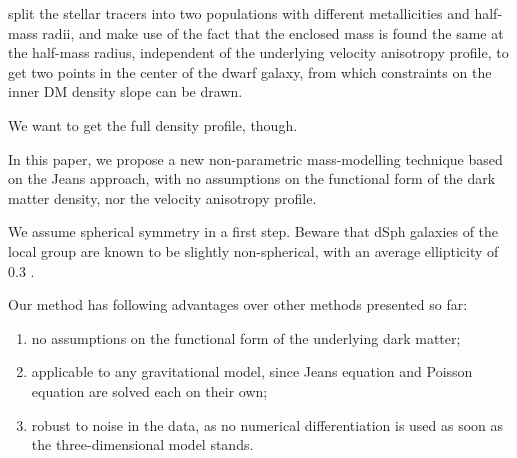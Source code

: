 
\citet{WalkerPenarrubia2011} split the stellar tracers into two
populations with different metallicities and half-mass radii, and make
use of the fact that the enclosed mass is found the same at the
half-mass radius, independent of the underlying velocity anisotropy
profile, to get two points in the center of the dwarf galaxy, from
which constraints on the inner DM density slope can be drawn.




We want to get the full density profile, though.

In this paper, we propose a new non-parametric mass-modelling
technique based on the Jeans approach, with no assumptions on the
functional form of the dark matter density, nor the velocity
anisotropy profile.



We assume spherical symmetry in a first step. Beware that dSph
galaxies of the local group are known to be slightly non-spherical,
with an average ellipticity of 0.3 .



Our method has following advantages over other methods presented so far:

\begin{enumerate}
\item no assumptions on the functional form of the underlying dark
  matter;
\item applicable to any gravitational model, since Jeans equation and
  Poisson equation are solved each on their own;
\item robust to noise in the data, as no numerical differentiation is
  used as soon as the three-dimensional model stands.
\end{enumerate}
